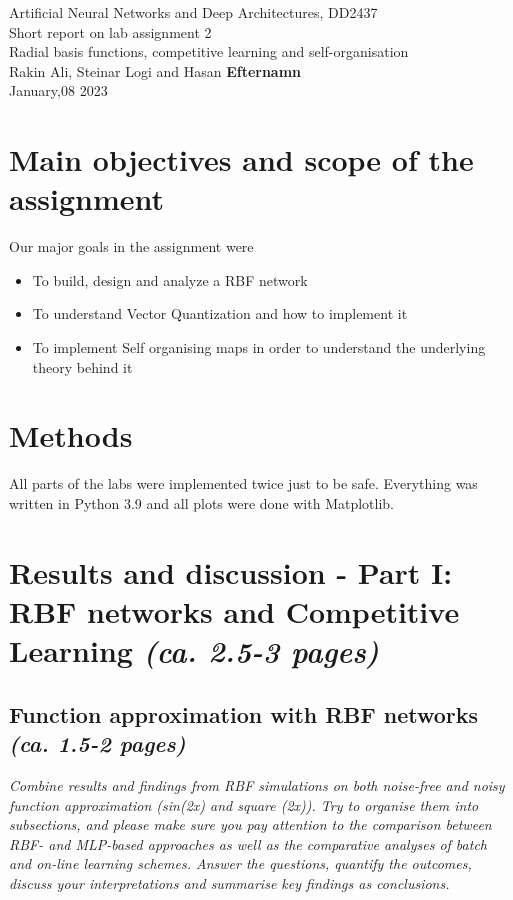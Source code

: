 \documentclass[a4paper]{article}
\begin{document}
\begin{center}
  {\large Artificial Neural Networks and Deep Architectures, DD2437}\\
  \vspace{7mm}
  {\huge Short report on lab assignment 2\\[1ex]}
  {\Large Radial basis functions, competitive learning and self-organisation}\\
  \vspace{8mm}  
  {\Large Rakin Ali, Steinar Logi and Hasan \textbf{Efternamn}\\}
  \vspace{4mm}
  {\large January,08 2023\\}
\end{center}

\section{Main objectives and scope of the assignment}

Our major goals in the assignment were  
\begin{itemize}
\item To build, design and analyze a RBF network 
\item To understand Vector Quantization and how to implement it  
\item To implement Self organising maps in order to understand the underlying theory behind it
\end{itemize}

\section{Methods} All parts of the labs were implemented twice just to be safe. Everything was written in Python 3.9 and all plots were done with Matplotlib. 

\section{Results and discussion - Part I: RBF networks and Competitive Learning \normalsize{\textit{(ca. 2.5-3 pages)}}}


\subsection{Function approximation with RBF networks\\ \normalsize{\textit{(ca. 1.5-2 pages)}}}
\textit{Combine results and findings from RBF simulations on both noise-free and noisy function approximation (sin(2x) and square (2x)). Try to organise them into subsections, and please make sure you pay attention to the comparison between RBF- and MLP-based approaches as well as the comparative analyses of batch and on-line learning schemes. Answer the questions, quantify the outcomes, discuss your interpretations and summarise key findings as conclusions.}
\end{document}

